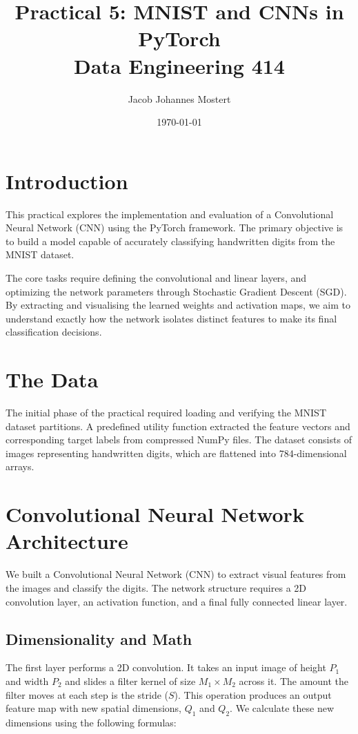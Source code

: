 \documentclass[12pt, a4paper]{article}
\title{Practical 5: MNIST and CNNs in PyTorch \\ \large Data Engineering 414}
\author{Jacob Johannes Mostert}
\date{\today}
\begin{document}
\maketitle

\section{Introduction}

This practical explores the implementation and evaluation of a Convolutional Neural Network (CNN) using the PyTorch framework. The primary objective is to build a model capable of accurately classifying handwritten digits from the MNIST dataset.

The core tasks require defining the convolutional and linear layers, and optimizing the network parameters through Stochastic Gradient Descent (SGD). By extracting and visualising the learned weights and activation maps, we aim to understand exactly how the network isolates distinct features to make its final classification decisions.

\section{The Data}

The initial phase of the practical required loading and verifying the MNIST dataset partitions. A predefined utility function extracted the feature vectors and corresponding target labels from compressed NumPy files. The dataset consists of images representing handwritten digits, which are flattened into 784-dimensional arrays.


\section{Convolutional Neural Network Architecture}

We built a Convolutional Neural Network (CNN) to extract visual features from the images and classify the digits. The network structure requires a 2D convolution layer, an activation function, and a final fully connected linear layer.

\subsection{Dimensionality and Math}
The first layer performs a 2D convolution. It takes an input image of height $P_1$ and width $P_2$ and slides a filter kernel of size $M_1 \times M_2$ across it. The amount the filter moves at each step is the stride ($S$). This operation produces an output feature map with new spatial dimensions, $Q_1$ and $Q_2$. We calculate these new dimensions using the following formulas:
\end{document}
